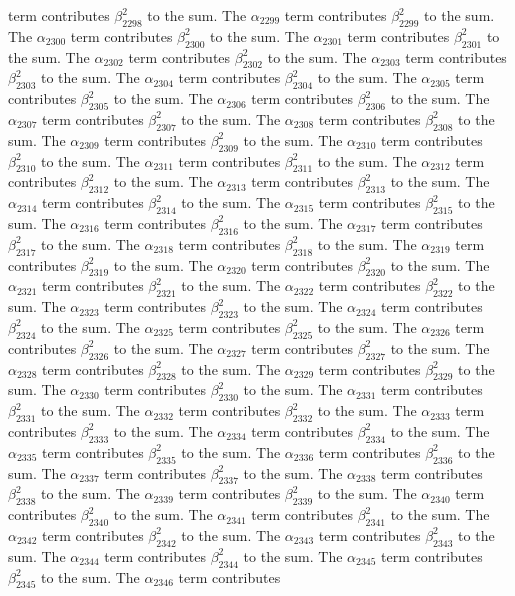\begin{lemma}
term contributes $\beta_{2298}^{2}$ to the sum. The $\alpha_{2299}$ term contributes $\beta_{2299}^{2}$ to the sum. The $\alpha_{2300}$ term contributes $\beta_{2300}^{2}$ to the sum. The $\alpha_{2301}$ term contributes $\beta_{2301}^{2}$ to the sum. The $\alpha_{2302}$ term contributes $\beta_{2302}^{2}$ to the sum. The $\alpha_{2303}$ term contributes $\beta_{2303}^{2}$ to the sum. The $\alpha_{2304}$ term contributes $\beta_{2304}^{2}$ to the sum. The $\alpha_{2305}$ term contributes $\beta_{2305}^{2}$ to the sum. The $\alpha_{2306}$ term contributes $\beta_{2306}^{2}$ to the sum. The $\alpha_{2307}$ term contributes $\beta_{2307}^{2}$ to the sum. The $\alpha_{2308}$ term contributes $\beta_{2308}^{2}$ to the sum. The $\alpha_{2309}$ term contributes $\beta_{2309}^{2}$ to the sum. The $\alpha_{2310}$ term contributes $\beta_{2310}^{2}$ to the sum. The $\alpha_{2311}$ term contributes $\beta_{2311}^{2}$ to the sum. The $\alpha_{2312}$ term contributes $\beta_{2312}^{2}$ to the sum. The $\alpha_{2313}$ term contributes $\beta_{2313}^{2}$ to the sum. The $\alpha_{2314}$ term contributes $\beta_{2314}^{2}$ to the sum. The $\alpha_{2315}$ term contributes $\beta_{2315}^{2}$ to the sum. The $\alpha_{2316}$ term contributes $\beta_{2316}^{2}$ to the sum. The $\alpha_{2317}$ term contributes $\beta_{2317}^{2}$ to the sum. The $\alpha_{2318}$ term contributes $\beta_{2318}^{2}$ to the sum. The $\alpha_{2319}$ term contributes $\beta_{2319}^{2}$ to the sum. The $\alpha_{2320}$ term contributes $\beta_{2320}^{2}$ to the sum. The $\alpha_{2321}$ term contributes $\beta_{2321}^{2}$ to the sum. The $\alpha_{2322}$ term contributes $\beta_{2322}^{2}$ to the sum. The $\alpha_{2323}$ term contributes $\beta_{2323}^{2}$ to the sum. The $\alpha_{2324}$ term contributes $\beta_{2324}^{2}$ to the sum. The $\alpha_{2325}$ term contributes $\beta_{2325}^{2}$ to the sum. The $\alpha_{2326}$ term contributes $\beta_{2326}^{2}$ to the sum. The $\alpha_{2327}$ term contributes $\beta_{2327}^{2}$ to the sum. The $\alpha_{2328}$ term contributes $\beta_{2328}^{2}$ to the sum. The $\alpha_{2329}$ term contributes $\beta_{2329}^{2}$ to the sum. The $\alpha_{2330}$ term contributes $\beta_{2330}^{2}$ to the sum. The $\alpha_{2331}$ term contributes $\beta_{2331}^{2}$ to the sum. The $\alpha_{2332}$ term contributes $\beta_{2332}^{2}$ to the sum. The $\alpha_{2333}$ term contributes $\beta_{2333}^{2}$ to the sum. The $\alpha_{2334}$ term contributes $\beta_{2334}^{2}$ to the sum. The $\alpha_{2335}$ term contributes $\beta_{2335}^{2}$ to the sum. The $\alpha_{2336}$ term contributes $\beta_{2336}^{2}$ to the sum. The $\alpha_{2337}$ term contributes $\beta_{2337}^{2}$ to the sum. The $\alpha_{2338}$ term contributes $\beta_{2338}^{2}$ to the sum. The $\alpha_{2339}$ term contributes $\beta_{2339}^{2}$ to the sum. The $\alpha_{2340}$ term contributes $\beta_{2340}^{2}$ to the sum. The $\alpha_{2341}$ term contributes $\beta_{2341}^{2}$ to the sum. The $\alpha_{2342}$ term contributes $\beta_{2342}^{2}$ to the sum. The $\alpha_{2343}$ term contributes $\beta_{2343}^{2}$ to the sum. The $\alpha_{2344}$ term contributes $\beta_{2344}^{2}$ to the sum. The $\alpha_{2345}$ term contributes $\beta_{2345}^{2}$ to the sum. The $\alpha_{2346}$ term contributes 
\end{lemma}
